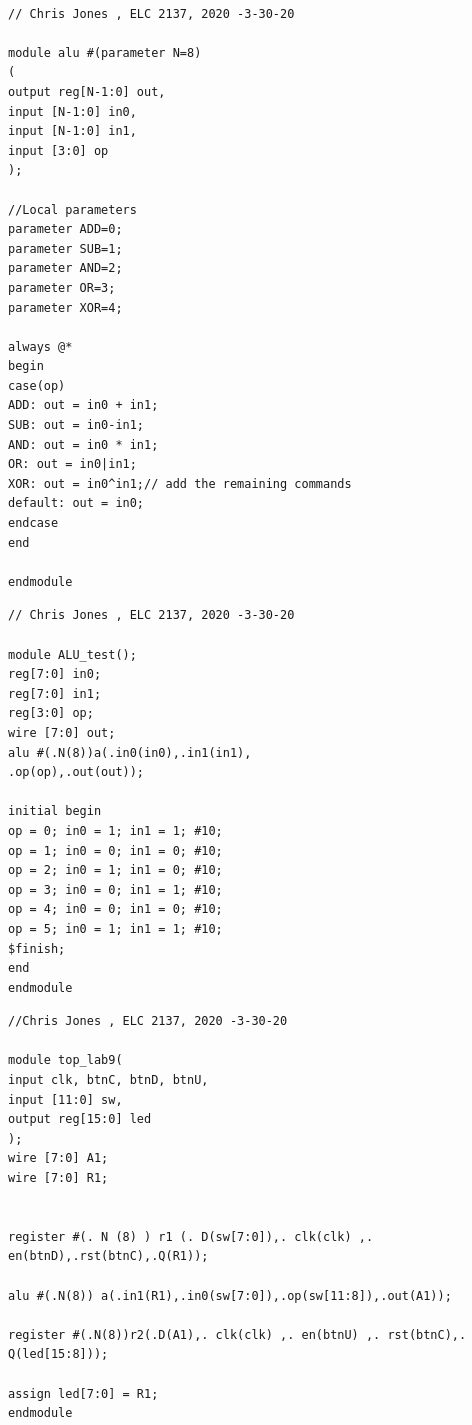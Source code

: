 \documentclass[11pt]{article}
\begin{document}
\begin{lstlisting}[style=Verilog,caption= Alu Source File,label=code:ex ]

// Chris Jones , ELC 2137, 2020 -3-30-20

module alu #(parameter N=8) 
(
output reg[N-1:0] out, 
input [N-1:0] in0, 
input [N-1:0] in1, 
input [3:0] op 
);

//Local parameters
parameter ADD=0; 
parameter SUB=1; 
parameter AND=2; 
parameter OR=3; 
parameter XOR=4;

always @* 
begin
case(op)
ADD: out = in0 + in1; 
SUB: out = in0-in1;
AND: out = in0 * in1;
OR: out = in0|in1;
XOR: out = in0^in1;// add the remaining commands 
default: out = in0;
endcase
end

endmodule

\end{lstlisting}


\begin{lstlisting}[style=Verilog,caption= Alu Test Bench ,label=code:ex ]
// Chris Jones , ELC 2137, 2020 -3-30-20

module ALU_test();
reg[7:0] in0;
reg[7:0] in1;
reg[3:0] op;
wire [7:0] out;
alu #(.N(8))a(.in0(in0),.in1(in1),
.op(op),.out(out));

initial begin
op = 0; in0 = 1; in1 = 1; #10;
op = 1; in0 = 0; in1 = 0; #10;
op = 2; in0 = 1; in1 = 0; #10;
op = 3; in0 = 0; in1 = 1; #10;
op = 4; in0 = 0; in1 = 0; #10;
op = 5; in0 = 1; in1 = 1; #10;
$finish;
end
endmodule

\end{lstlisting}



\begin{lstlisting}[style=Verilog,caption=Top Level Source File,label=code:ex ]
//Chris Jones , ELC 2137, 2020 -3-30-20

module top_lab9(
input clk, btnC, btnD, btnU,
input [11:0] sw,
output reg[15:0] led
);
wire [7:0] A1;
wire [7:0] R1;


register #(. N (8) ) r1 (. D(sw[7:0]),. clk(clk) ,. en(btnD),.rst(btnC),.Q(R1));

alu #(.N(8)) a(.in1(R1),.in0(sw[7:0]),.op(sw[11:8]),.out(A1));

register #(.N(8))r2(.D(A1),. clk(clk) ,. en(btnU) ,. rst(btnC),. Q(led[15:8]));

assign led[7:0] = R1;
endmodule

\end{lstlisting}
\end{document}
